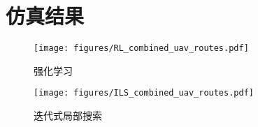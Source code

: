 \documentclass[AutoFakeBold]{LZUThesis}
\begin{document}
\section{仿真结果}

\begin{figure}[H]
	\centering
	\texttt{[image: figures/RL\_combined\_uav\_routes.pdf]}
	\caption{强化学习}
	\label{fig:RL_combined_uav_routes}
\end{figure}
\begin{figure}[H]
	\centering
	\texttt{[image: figures/ILS\_combined\_uav\_routes.pdf]}
	\caption{迭代式局部搜索}
	\label{fig:ILS_combined_uav_routes}
\end{figure}




\end{document}
